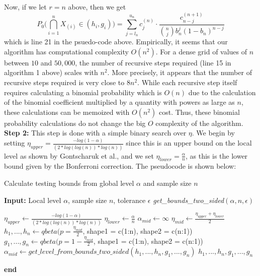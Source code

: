 \documentclass[article]{jss}
\begin{document}
%
Now, if we let $r = n$ above, then we get 
%
\begin{equation*}
    P_{0}\Big(\bigcap\limits_{i=1}^{n} X_{(i)} \in (h_{i}, g_{i})\Big) = \sum_{j = l_{n}}^{u_{n}} c_{j}^{(n)} \cdot \frac{c_{n - j}^{(n + 1)}}{\binom{n}{j}b_{n}^{j}(1 - b_{n})^{n-j}}
\end{equation*}
%
which is line 21 in the psuedo-code above.
\newline
\newline
Empirically, it seems that our algorithm has computational complexity $O(n^{2})$. For a dense grid of values of $n$ between $10$ and $50,000$, the number of recursive steps required (line 15 in algorithm 1 above) scales with $n^{2}$. More precisely, it appears that the number of recursive steps required is very close to $8n^{2}$. While each recursive step itself requires calculating a binomial probability which is $O(n)$ due to the calculation of the binomial coefficient multiplied by a quantity with powers as large as $n$, these calculations can be memoized with $O(n^{2})$ cost. Thus, these binomial probability calculations do not change the big $O$ complexity of the algorithm.
\newline
\newline
\textbf{Step 2:} This step is done with a simple binary search over $\eta$. We begin by setting $\eta_{upper} = \frac{-log(1 - \alpha)}{(2 * log(log(n)) * log(n))}$ since this is an upper bound on the local level as shown by Gontscharuk et al., and we set $\eta_{lower} = \frac{\alpha}{n}$, as this is the lower bound given by the Bonferroni correction. The pseudocode is shown below:
\begin{algorithm}[H]
\caption{Calculate testing bounds from global level $\alpha$ and sample size $n$}
\textbf{Input:} Local level $\alpha$, sample size $n$, tolerance $\epsilon$
\newline
\textit{get\_bounds\_two\_sided}$(\alpha, n, \epsilon)$
\begin{algorithmic}[1]
\STATE $\eta_{upper} \leftarrow \frac{-log(1 - \alpha)}{(2 * log(log(n)) * log(n))}$
\STATE $\eta_{lower} \leftarrow \frac{\alpha}{n}$
\STATE $\alpha_{mid} \leftarrow \infty$
\STATE $\eta_{mid} \leftarrow \frac{\eta_{upper} + \eta_{lower}}{2}$
\STATE $h_{1}, ..., h_{n} \leftarrow qbeta(p = \frac{\eta_{mid}}{2}$, shape1 = c(1:n), shape2 = c(n:1))
\STATE $g_{1}, ..., g_{n} \leftarrow qbeta(p = 1 - \frac{\eta_{mid}}{2}$, shape1 = c(1:n), shape2 = c(n:1))
\STATE $\alpha_{mid} \leftarrow get\_level\_from\_bounds\_two\_sided(h_{1}, ..., h_{n}, g_{1}, ..., g_{n})$
\ENDWHILE
\RETURN $h_{1}, ..., h_{n}, g_{1}, ..., g_{n}$
\end{algorithmic}
\textbf{end}
\end{algorithm}
\end{document}
